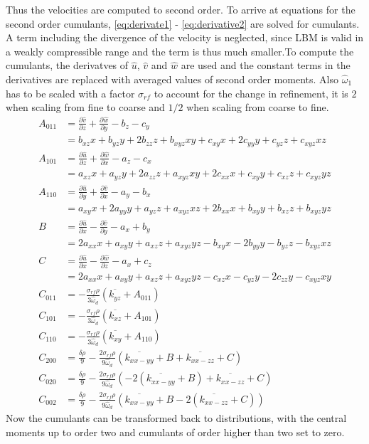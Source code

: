 Thus the velocities are computed to second order. To arrive at equations for the second order cumulants, \eqref{eq:derivate1} - \eqref{eq:derivative2} are solved for cumulants. A term including the divergence of the velocity is neglected, since LBM is valid in a weakly compressible range and the term is thus much smaller.To compute the cumulants, the derivatves of $\hat{u}$, $\hat{v}$ and $\hat{w}$ are used and the constant terms in the derivatives are replaced with averaged values of second order moments. Also $\hat{\omega}_1$ has to be scaled with a factor $\sigma_{rf}$ to account for the change in refinement, it is $2$ when scaling from fine to coarse and $1/2$ when scaling from coarse to fine. 
\begin{align}
	A_{011} &= \frac{\partial \hat{v}}{\partial z} + \frac{\partial \hat{w}}{\partial y} - b_z - c_y \\
	&= b_{xz} x + b_{yz} y + 2 b_{zz} z + b_{xyz} xy + c_{xy} x + 2 c_{yy} y + c_{yz} z + c_{xyz} xz \\
	A_{101} &= \frac{\partial \hat{u}}{\partial z} + \frac{\partial \hat{w}}{\partial x} - a_z - c_x \\
	&= a_{xz} x + a_{yz} y + 2 a_{zz} z + a_{xyz} xy + 2 c_{xx} x + c_{xy} y + c_{xz} z + c_{xyz} yz \\
	A_{110} &= \frac{\partial \hat{u}}{\partial y} + \frac{\partial \hat{v}}{\partial x} - a_y - b_x \\
	&= a_{xy} x + 2 a_{yy} y + a_{yz} z + a_{xyz} xz + 2 b_{xx} x + b_{xy} y + b_{xz} z + b_{xyz} yz \\
	B &= \frac{\partial \hat{u}}{\partial x} - \frac{\partial \hat{v}}{\partial y} - a_x + b_y \\
	&= 2 a_{xx} x + a_{xy} y + a_{xz} z + a_{xyz} yz - b_{xy} x - 2 b_{yy} y - b_{yz} z - b_{xyz} xz \\
	C &= \frac{\partial \hat{u}}{\partial x} - \frac{\partial \hat{w}}{\partial z} - a_x + c_z \\
	&= 2 a_{xx} x + a_{xy} y + a_{xz} z + a_{xyz} yz - c_{xz} x - c_{yz} y - 2 c_{zz} y - c_{xyz} xy\\
	C_{011} &= - \frac{\sigma_{rf} \rho}{3 \hat{\omega}_d} \left( \overline{k_{yz}} + A_{011} \right)\\
	C_{101} &= - \frac{\sigma_{rf} \rho}{3 \hat{\omega}_d} \left( \overline{k_{xz}} + A_{101} \right) \\
	C_{110} &= - \frac{\sigma_{rf} \rho}{3 \hat{\omega}_d} \left( \overline{k_{xy}} + A_{110} \right) \\
	C_{200} &= \frac{\delta \rho}{9} - \frac{2 \sigma_{rf} \rho}{9 \hat{\omega}_d} \left( \overline{k_{xx-yy}} + B + \overline{k_{xx-zz}} + C \right) \\
	C_{020} &= \frac{\delta \rho}{9} - \frac{2 \sigma_{rf} \rho}{9 \hat{\omega}_d} \left( -2 \left(\overline{k_{xx-yy}} + B\right) + \overline{k_{xx-zz}} + C \right) \\
	C_{002} &= \frac{\delta \rho}{9} - \frac{2 \sigma_{rf} \rho}{9 \hat{\omega}_d} \left( \overline{k_{xx-yy}} + B - 2 \left( \overline{k_{xx-zz}} + C \right) \right)		
\end{align}
Now the cumulants can be transformed back to distributions, with the central moments up to order two and cumulants of order higher than two set to zero. 